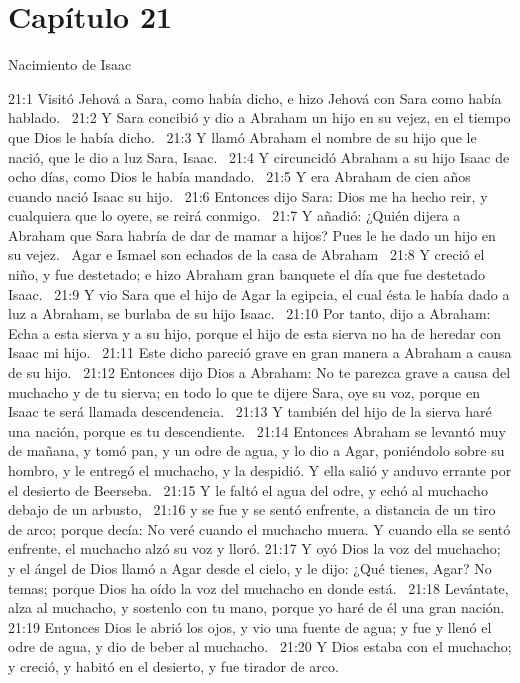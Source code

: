 \section*{Capítulo 21}
Nacimiento de Isaac  

21:1 Visitó Jehová a Sara, como había dicho, e hizo Jehová con Sara como había hablado.  
21:2 Y Sara concibió y dio a Abraham un hijo en su vejez, en el tiempo que Dios le había dicho.  
21:3 Y llamó Abraham el nombre de su hijo que le nació, que le dio a luz Sara, Isaac.  
21:4 Y circuncidó Abraham a su hijo Isaac de ocho días, como Dios le había mandado.  
21:5 Y era Abraham de cien años cuando nació Isaac su hijo.  
21:6 Entonces dijo Sara: Dios me ha hecho reir, y cualquiera que lo oyere, se reirá conmigo.  
21:7 Y añadió: ¿Quién dijera a Abraham que Sara habría de dar de mamar a hijos? Pues le he dado un hijo en su vejez.  
Agar e Ismael son echados de la casa de Abraham  
21:8 Y creció el niño, y fue destetado; e hizo Abraham gran banquete el día que fue destetado Isaac.  
21:9 Y vio Sara que el hijo de Agar la egipcia, el cual ésta le había dado a luz a Abraham, se burlaba de su hijo Isaac.  
21:10 Por tanto, dijo a Abraham: Echa a esta sierva y a su hijo, porque el hijo de esta sierva no ha de heredar con Isaac mi hijo.  
21:11 Este dicho pareció grave en gran manera a Abraham a causa de su hijo.  
21:12 Entonces dijo Dios a Abraham: No te parezca grave a causa del muchacho y de tu sierva; en todo lo que te dijere Sara, oye su voz, porque en Isaac te será llamada descendencia.  
21:13 Y también del hijo de la sierva haré una nación, porque es tu descendiente.  
21:14 Entonces Abraham se levantó muy de mañana, y tomó pan, y un odre de agua, y lo dio a Agar, poniéndolo sobre su hombro, y le entregó el muchacho, y la despidió. Y ella salió y anduvo errante por el desierto de Beerseba.  
21:15 Y le faltó el agua del odre, y echó al muchacho debajo de un arbusto,  
21:16 y se fue y se sentó enfrente, a distancia de un tiro de arco; porque decía: No veré cuando el muchacho muera. Y cuando ella se sentó enfrente, el muchacho alzó su voz y lloró. 
21:17 Y oyó Dios la voz del muchacho; y el ángel de Dios llamó a Agar desde el cielo, y le dijo: ¿Qué tienes, Agar? No temas; porque Dios ha oído la voz del muchacho en donde está.  
21:18 Levántate, alza al muchacho, y sostenlo con tu mano, porque yo haré de él una gran nación.  
21:19 Entonces Dios le abrió los ojos, y vio una fuente de agua; y fue y llenó el odre de agua, y dio de beber al muchacho.  
21:20 Y Dios estaba con el muchacho; y creció, y habitó en el desierto, y fue tirador de arco.  
